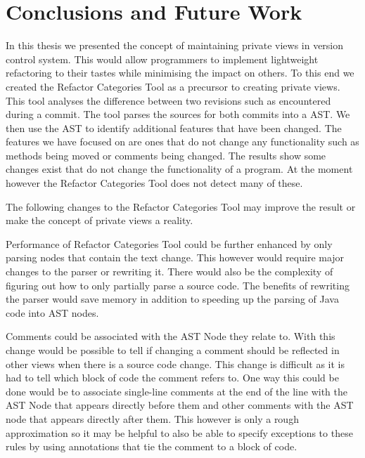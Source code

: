 
\chapter{Conclusions and Future Work}\label{C:con}

In this thesis we presented the concept of maintaining private views in version control system. 
This would allow programmers to implement lightweight refactoring to their tastes while minimising the impact on others.  
To this end we created the Refactor Categories Tool as a precursor to creating private views. 
This tool analyses the difference between two revisions such as encountered during a commit.  
The tool parses the sources for both commits into a AST. 
We then use the AST to identify additional features that have been changed. 
The features we have focused on are ones that do not change any functionality such as methods being moved or comments being changed. 
The results show some changes exist that do not change the functionality of a program.
At the moment however the Refactor Categories Tool does not detect many of these.  

The following changes to the Refactor Categories Tool may improve the result or make the concept of private views a reality.

Performance of Refactor Categories Tool could be further enhanced by only parsing nodes that contain the text change.  This however would require major changes to the parser or rewriting it. There would also be the complexity of figuring out how to only partially parse a source code. The benefits of rewriting the parser would save memory in addition to speeding up the parsing of Java code into AST nodes.


Comments could be associated with the AST Node they relate to.  With this change would be possible to tell if changing a comment should be reflected in other views when there is a source code change. This change is difficult as it is had to tell which block of code the comment refers to.  One way this could be done would be to associate single-line comments at the end of the line with the AST Node that appears directly before them and other comments with the AST node that appears directly after them.  This however is only a rough approximation so it may be helpful to also be able to specify exceptions to these rules by using annotations that tie the comment to a block of code.


